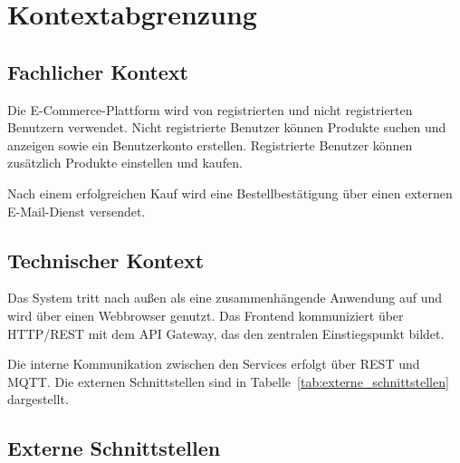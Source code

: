 \section{Kontextabgrenzung}

\subsection{Fachlicher Kontext}

Die E-Commerce-Plattform wird von registrierten und nicht registrierten Benutzern verwendet.
Nicht registrierte Benutzer können Produkte suchen und anzeigen sowie ein Benutzerkonto erstellen.
Registrierte Benutzer können zusätzlich Produkte einstellen und kaufen.

Nach einem erfolgreichen Kauf wird eine Bestellbestätigung über einen externen E-Mail-Dienst versendet.


\subsection{Technischer Kontext}

Das System tritt nach außen als eine zusammenhängende Anwendung auf und wird über einen Webbrowser genutzt.
Das Frontend kommuniziert über HTTP/REST mit dem API Gateway, das den zentralen Einstiegspunkt bildet.

Die interne Kommunikation zwischen den Services erfolgt über REST und MQTT.
Die externen Schnittstellen sind in
Tabelle~\ref{tab:externe_schnittstellen} dargestellt.

\subsection{Externe Schnittstellen}

